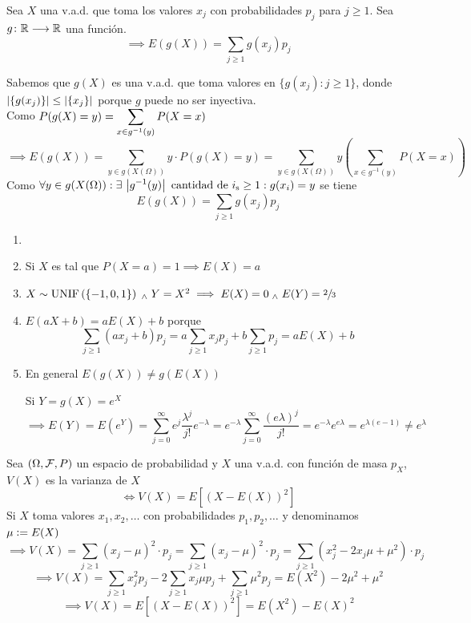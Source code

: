 \begin{teo} \label{teo:esperanzaporg}
	Sea $X$ una v.a.d. que toma los valores $x_j$ con probabilidades $p_j$ para $j \geq 1$. Sea $g \colon \mathbb{R} \longrightarrow \mathbb{R}$ una función.
	\[\implies E(g(X))=\sum_{j\geq 1}g(x_j)p_j\]
	\begin{dem}
		Sabemos que $g(X)$ es una v.a.d. que toma valores en $\{g(x_j) : j\geq 1\}$, donde $\left|\{g(x_j)\}\right|\leq\left|\{x_j\}\right|$ porque $g$ puede no ser inyectiva. \\
		Como $\displaystyle P(g(X)=y) = \sum_{x\in g^{-1}(y)} P(X=x)$
		\[\implies E(g(X))=\sum_{y\in g(X(\Omega))}y\cdot P(g(X)=y)=\sum_{y\in g(X(\Omega))}y \left(\sum_{x\in g^{-1}(y)} P(X=x)\right)\]
		Como $\displaystyle \forall y \in g(X(\Omega)) : \exists \, \left|g^{-1}(y)\right| \text{
				cantidad de } i_{\text{s}} \geq 1 : g(x_i)=y$ se tiene
		\[E(g(X))=\sum_{j\geq 1}g(x_j)p_j\]
	\end{dem}
\end{teo}
\begin{obs}
	\begin{enumerate}
		\item[]
		\item Si $X$ es tal que $P(X=a)=1\implies E(X)=a$
		\item $X \sim \operatorname{UNIF}\left(\{-1, 0, 1\}\right) \; _{\wedge} \; Y=X^2 \implies E(X)=0 \; _{\wedge} \; E(Y)=\sfrac{2}{3}$
		\item $E(aX+b)=aE(X)+b$ porque
		      \[\sum_{j\geq 1}(ax_j+b)p_j=a\sum_{j\geq 1}x_jp_j+b\sum_{j\geq 1}p_j=aE(X)+b\]
		\item En general $E(g(X)) \ne g(E(X))$ \hfill {}
		      \begin{ejem}[$X\sim\poisson{\lambda} \implies E(X)=\lambda$]
			      Si $Y=g(X)=e^X$
			      \[\implies E(Y)=E(e^Y)=\sum_{j=0}^\infty e^j\frac{\lambda^j}{j!}e^{-\lambda}=e^{-\lambda}\sum_{j=0}^\infty \frac{(e\lambda)^{j}}{j!}=e^{-\lambda}e^{e\lambda}=e^{\lambda(e-1)}\ne e^\lambda\]
		      \end{ejem}
	\end{enumerate}
\end{obs}
\vspace{-1.2cm}
\begin{defn}[Varianza]
	Sea $(\Omega, \mathcal{F}, P)$ un espacio de probabilidad y $X$ una v.a.d. con función de masa $p_X$, $V(X)$ es la varianza de $X$
	\[\iff V(X)=E\left[(X-E(X))^2\right]\]
	Si $X$ toma valores $x_1, x_2, \dots$ con probabilidades $p_1, p_2, \dots$ y
	denominamos $\mu \vcentcolon= E(X)$
	\[\implies V(X)=\sum_{j\geq 1}(x_j-\mu)^2\cdot p_j = \sum_{j\geq 1}(x_j-\mu)^2\cdot p_j = \sum_{j\geq 1}(x_j^2-2x_j\mu+\mu^2)\cdot p_j\]
	\[\implies V(X)=\sum_{j\geq 1}x_j^2p_j -2\sum_{j\geq 1}x_j\mu p_j +\sum_{j\geq 1}\mu^2p_j = E(X^2)-2\mu^2+\mu^2\]
	\[\implies \boxed{V(X) = E\left[\left(X-E(X)\right)^2\right] = E\left(X^2\right)-{E(X)}^2}\]
\end{defn}

